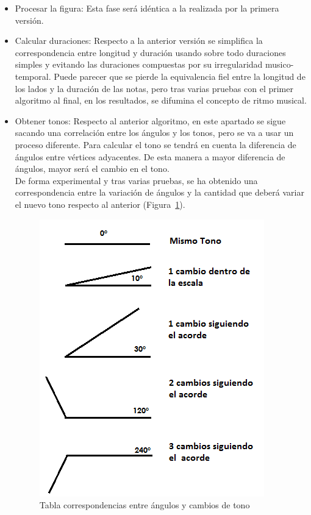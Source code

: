 \begin{itemize}
	\item Procesar la figura: Esta fase será idéntica a la realizada por la primera versión.

	\item Calcular duraciones: Respecto a la anterior versión se simplifica la correspondencia entre longitud y duración usando sobre todo duraciones simples y evitando las duraciones compuestas por su irregularidad musico-temporal. Puede parecer que se pierde la equivalencia fiel entre la longitud de los lados y la duración de las notas, pero tras varias pruebas con el primer algoritmo al final, en los resultados, se difumina el concepto de ritmo musical.

	\item Obtener tonos: Respecto al anterior algoritmo, en este apartado se sigue sacando una correlación entre los ángulos y los tonos, pero se va a usar un proceso diferente. Para calcular el tono se tendrá en cuenta la diferencia de ángulos entre vértices adyacentes. De esta manera a mayor diferencia de ángulos, mayor será el cambio en el tono. \\
De forma experimental y tras varias pruebas, se ha obtenido una correspondencia entre la variación de ángulos y la cantidad que deberá variar el nuevo tono respecto al anterior (Figura~\ref{fig:Figura3Voz1}). 

		\begin{figure}[htbp]
		\centering
		\hspace*{0.0in}
		\includegraphics[scale=0.75]{graphics/tabla-corresp-Tono-Angulo.png}
		\caption{Tabla correspondencias entre ángulos y cambios de tono}
		\label{fig:Figura3Voz1}
		\end{figure}


\end{itemize}
